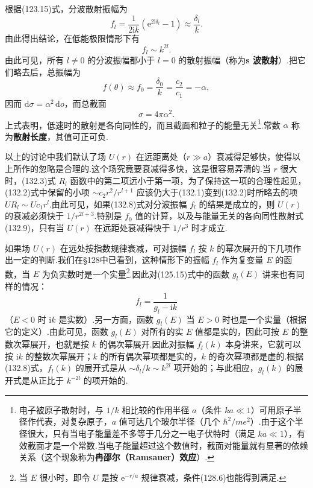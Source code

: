 根据(123.15)式，分波散射振幅为
\begin{equation*}
  f_l=\frac{1}{2\mathrm{i}k}\left(\mathrm{e}^{2\mathrm{i}\delta_l}-1\right)
  \approx\frac{\delta_l}{k}.
\end{equation*}
由此得出结论，在低能极限情形下有
\begin{equation}
  f_l\sim k^{2l}.
\end{equation}
由此可见，所有 $l\neq0$ 的分波振幅都小于 $l=0$ 的散射振幅（称为\textbf{s 波散射}）.把它们略去后，总振幅为
\begin{equation}
  f(\theta)\approx f_0=\frac{\delta_0}{k}
  =\frac{c_2}{c_1}=-\alpha,
\end{equation}
因而 $\mathrm{d}\sigma=\alpha^2\,\mathrm{d}o$，而总截面
\begin{equation}
  \sigma=4\pi\alpha^2.
\end{equation}
上式表明，低速时的散射是各向同性的，而且截面和粒子的能量无关\footnote{电子被原子散射时，与 $1/k$ 相比较的作用半径 $a$（条件 $ka\ll1$）可用原子半径作代表，对复杂原子，$a$ 值可达几个玻尔半径（几个 $\hbar^2/me^2$）.由于这个半径很大，只有当电子能量差不多等于几分之一电子伏特时（满足 $ka\ll1$），有效截面才是一个常数.当电子能量超过这个数值时，截面对能量就有显著的依赖关系（这个现象称为\textbf{冉邵尔（Ramsauer）效应}）.}.常数 $\alpha$ 称为\textbf{散射长度}，其值可正可负.

以上的讨论中我们默认了场 $U(r)$ 在远距离处（$r\gg a$）衰减得足够快，使得以上所作的忽略是合理的.这个场究竟要衰减得多快，这是很容易弄清的.当 $r$ 很大时，(132.3)式 $R_l$ 函数中的第二项远小于第一项，为了保持这一项的合理性起见，(132.2)式中保留的小项 $\sim c_2r^2/r^{l+1}$ 应该仍大于(132.1)变到(132.2)时所略去的项 $UR_l\sim Uc_1r^l$.由此可见，如果(132.8)式对分波振幅 $f_l$ 的结果是成立的，则 $U(r)$ 的衰减必须快于 $1/r^{2l+3}$.特别是 $f_0$ 值的计算，以及与能量无关的各向同性散射式(132.9)，只有当 $U(r)$ 在远距处衰减得快于 $1/r^3$ 时才成立.

如果场 $U(r)$ 在远处按指数规律衰减，可对振幅 $f_l$ 按 $k$ 的幂次展开的下几项作出一定的判断.我们在§128中已看到，这种情形下的振幅 $f_l$ 作为复变量 $E$ 的函数，当 $E$ 为负实数时是一个实量\footnote{当 $E$ 很小时，即令 $U$ 是按 $\mathrm{e}^{-r/a}$ 规律衰减，条件(128.6)也能得到满足.}.因此对(125.15)式中的函数 $g_l(E)$ 讲来也有同样的情况：
\begin{equation*}
  f_l=\frac{1}{g_l-\mathrm{i}k}
\end{equation*}
（$E<0$ 时 $\mathrm{i}k$ 是实数）.另一方面，函数 $g_l(E)$ 当 $E>0$ 时也是一个实量（根据它的定义）.由此可见，函数 $g_l(E)$ 对所有的实 $E$ 值都是实的，因此可按 $E$ 的整数次幂展开，也就是按 $k$ 的偶次幂展开.因此对振幅 $f_l(k)$ 本身讲来，它就可以按 $\mathrm{i}k$ 的整数次幂展开；$k$ 的所有偶次幂项都是实的，$k$ 的奇次幂项都是虚的.根据(132.8)式，$f_l(k)$ 的展开式是从 $\sim\delta_l/k\sim k^{2l}$ 项开始的；与此相应，$g_l(k)$ 的展开式是从正比于 $k^{-2l}$ 的项开始的.

